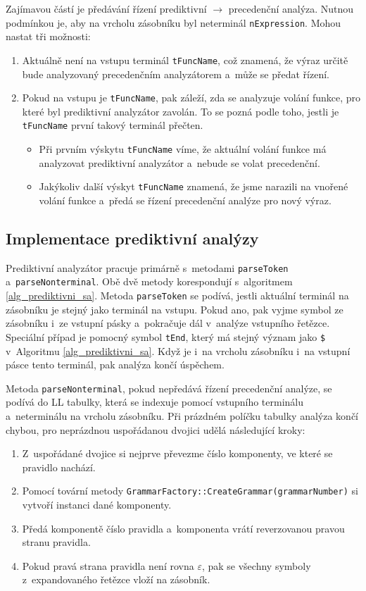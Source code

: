 Zajímavou částí je předávání řízení prediktivní $\rightarrow$ precedenční analýza.
Nutnou podmínkou je, aby na vrcholu zásobníku byl neterminál \texttt{nExpression}.
Mohou nastat tři možnosti:
\begin{enumerate}[label=\arabic*)]
    \item Aktuálně není na vstupu terminál \texttt{tFuncName}, což znamená, že výraz určitě bude analyzovaný precedenčním analyzátorem a~může se předat řízení.
    \item Pokud na vstupu je \texttt{tFuncName}, pak záleží, zda se analyzuje volání funkce, pro které byl prediktivní analyzátor zavolán.
    To se pozná podle toho, jestli je \texttt{tFuncName} první takový terminál přečten. 
    \begin{itemize}
        \item Při prvním výskytu \texttt{tFuncName} víme, že aktuální volání funkce má analyzovat prediktivní analyzátor a~nebude se volat precedenční.
        \item Jakýkoliv další výskyt \texttt{tFuncName} znamená, že jsme narazili na vnořené volání funkce a~předá se řízení precedenční analýze pro nový výraz.
    \end{itemize}  
\end{enumerate}

\subsection*{Implementace prediktivní analýzy}
Prediktivní analyzátor pracuje primárně s~metodami \texttt{parseToken} a~\texttt{parseNonterminal}.
Obě dvě metody korespondují s~algoritmem \ref{alg_prediktivni_sa}.
Metoda \texttt{parseToken} se podívá, jestli aktuální terminál na zásobníku je stejný jako terminál na vstupu.
Pokud ano, pak vyjme symbol ze zásobníku i~ze vstupní pásky a~pokračuje dál v~analýze vstupního řetězce.
Speciální případ je pomocný symbol \texttt{tEnd}, který má stejný význam jako \texttt{\$} v~Algoritmu \ref{alg_prediktivni_sa}.
Když je i~na vrcholu zásobníku i~na vstupní pásce tento terminál, pak analýza končí úspěchem.

Metoda \texttt{parseNonterminal}, pokud nepředává řízení precedenční analýze, se podívá do LL tabulky, která se indexuje pomocí vstupního terminálu a~neterminálu na vrcholu zásobníku.
Při prázdném políčku tabulky analýza končí chybou, pro neprázdnou uspořádanou dvojici udělá následující kroky:
\begin{enumerate}[label=\arabic*)]
    \item Z~uspořádané dvojice si nejprve převezme číslo komponenty, ve které se pravidlo nachází.
    \item Pomocí tovární metody \texttt{GrammarFactory::CreateGrammar(grammarNumber)} si vytvoří instanci dané komponenty.
    \item Předá komponentě číslo pravidla a~komponenta vrátí reverzovanou pravou stranu pravidla.
    \item Pokud pravá strana pravidla není rovna $\varepsilon$, pak se všechny symboly z~expandovaného řetězce vloží na zásobník.
\end{enumerate}

